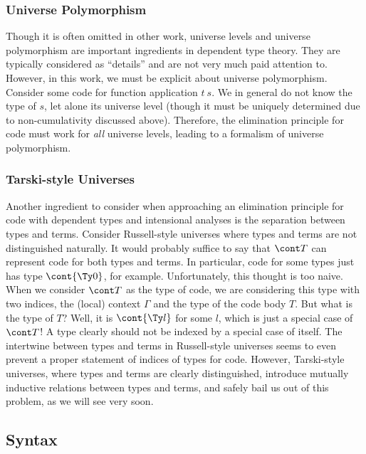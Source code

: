 \subsubsection{Universe Polymorphism}

Though it is often omitted in other work, universe levels and universe polymorphism
are important ingredients in dependent type theory. %
They are typically considered as ``details'' and are not very much paid attention
to. %
However, in this work, we must be explicit about universe polymorphism. %
Consider some code for function application $t~s$. %
We in general do not know the type of $s$, let alone its universe level (though it
must be uniquely determined due to non-cumulativity discussed above). %
Therefore, the elimination principle for code must work for \emph{all} universe
levels, leading to a formalism of universe polymorphism. 

\subsubsection{Tarski-style Universes}

Another ingredient to consider when approaching an elimination principle for code with
dependent types and intensional analyses is the separation between types and terms. %
Consider Russell-style universes where types and terms are not distinguished
naturally. %
It would probably suffice to say that $\cont T$ can represent code for both types and
terms. %
In particular, code for some types just has type $\cont{\Ty 0}$, for example. %
Unfortunately, this thought is too naive. %
When we consider $\cont T$ as the type of code, we are considering this type with two
indices, the (local) context $\Gamma$ and the type of the code body $T$. %
But what is the type of $T$? %
Well, it is $\cont{\Ty l}$ for some $l$, which is just a special case of $\cont T$! %
A type clearly should not be indexed by a special case of itself. %
The intertwine between types and terms in Russell-style universes seems to even
prevent a proper statement of indices of types for code. %
However, Tarski-style universes, where types and terms are clearly distinguished, introduce
mutually inductive relations between types and terms, and safely bail us out of this
problem, as we will see very soon.

\subsection{Syntax}

